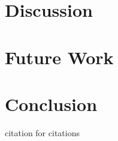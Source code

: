 \documentclass[a4paper]{report}
\begin{document}
\chapter{Discussion}
\label{chap:discussion}


\chapter{Future Work}
\label{chap:future}


\chapter{Conclusion}




\newpage
citation for citations\cite{Bengtsson1995}


\newpage



\appendix

\end{document}
